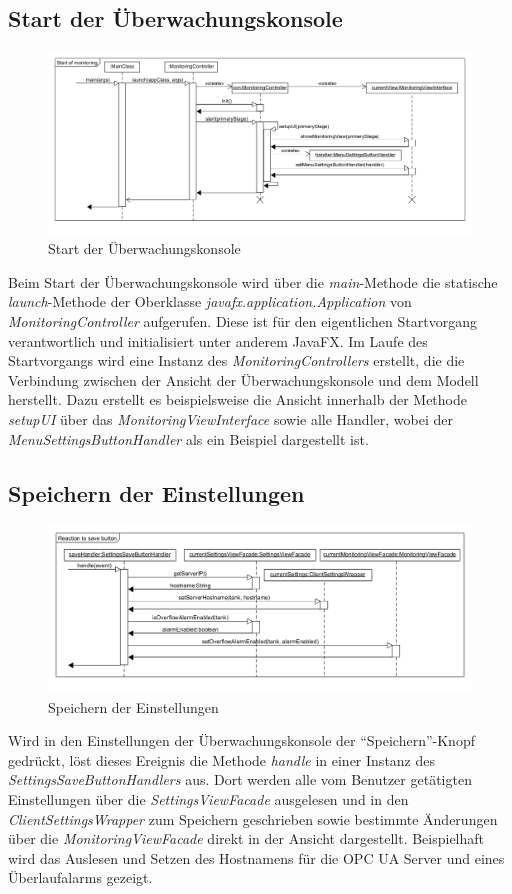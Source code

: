 \documentclass[parskip=full]{scrartcl}
\begin{document}
\subsection{Start der Überwachungskonsole}
\begin{figure}[H]
	\centering
	\includegraphics[scale=0.4]{design/sequence-diagrams/Start-of-monitoring.png}
	\caption{Start der Überwachungskonsole}
\end{figure}
Beim Start der Überwachungskonsole wird über die \emph{main}-Methode die statische \emph{launch}-Methode der Oberklasse \emph{javafx.application.Application} von \emph{MonitoringController} aufgerufen. Diese ist für den eigentlichen Startvorgang verantwortlich und initialisiert unter anderem JavaFX.
Im Laufe des Startvorgangs wird eine Instanz des \emph{MonitoringControllers} erstellt, die die Verbindung zwischen der Ansicht der Überwachungskonsole und dem Modell herstellt. Dazu erstellt es beispielsweise die Ansicht innerhalb der Methode \emph{setupUI} über das \emph{MonitoringViewInterface} sowie alle Handler, wobei der \emph{MenuSettingsButtonHandler} als ein Beispiel dargestellt ist.

\subsection{Speichern der Einstellungen}
\begin{figure}[H]
	\centering
	\includegraphics[scale=0.4]{design/sequence-diagrams/Save-settings.png}
	\caption{Speichern der Einstellungen}
\end{figure}
Wird in den Einstellungen der Überwachungskonsole der "`Speichern"'-Knopf gedrückt, löst dieses Ereignis die Methode \emph{handle} in einer Instanz des \emph{SettingsSaveButtonHandlers} aus.
Dort werden alle vom Benutzer getätigten Einstellungen über die \emph{SettingsViewFacade} ausgelesen und in den \emph{ClientSettingsWrapper} zum Speichern geschrieben sowie bestimmte Änderungen über die \emph{MonitoringViewFacade} direkt in der Ansicht dargestellt.
Beispielhaft wird das Auslesen und Setzen des Hostnamens für die OPC UA Server und eines Überlaufalarms gezeigt.
\end{document}
